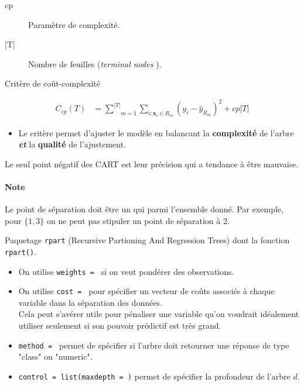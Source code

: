\documentclass[10pt, french]{article}
\begin{document}
\begin{multicols*}{3}
\begin{definitionNOHFILL}
\begin{description}
	\item[cp]	Paramètre de complexité.
	\item[|T|]	Nombre de feuilles (\og \textit{terminal nodes} \fg{}).
	\item[Critère de coût-complexité]
\end{description}
\begin{align*}
	C_{cp}(T)	
	&=	\underset{m = 1}{\overset{| T |}{\sum}}\underset{i:\bm{x}_{i} \in R_{m}}{\sum} (y_{i} - \hat{y}_{R_{m}})^{2} + cp | T |
\end{align*}
\begin{itemize}[leftmargin = *]
	\item	Le critère permet d'ajuster le modèle en balancant la \textbf{complexité} de l'arbre \textbf{\textit{et}} la \textbf{qualité} de l'ajustement.
\end{itemize}
\end{definitionNOHFILL}

Le seul point négatif des CART est leur précision qui a tendance à être mauvaise.

\paragraph{Note}	Le point de séparation doit être un qui parmi l'ensemble donné. Par exemple, pour $\{1, 3\}$  on ne peut pas stipuler un point de séparation à 2.

\begin{definitionNOHFILLsub}
Paquetage \texttt{rpart} (Recursive Partioning And Regression Trees) dont la fonction \texttt{rpart()}.
\begin{itemize}
	\item	On utilise \texttt{weights = } si on veut pondérer des observations.
	\item	On utilise \texttt{cost = } pour spécifier un vecteur de coûts associés à chaque variable dans la séparation des données. \\
			Cela peut s'avérer utile pour pénaliser une variable qu'on voudrait idéalement utiliser seulement si son pouvoir prédictif est très grand.
	\item	\texttt{method = } permet de spécifier si l'arbre doit retourner une réponse de type "class" ou "numeric".
	\item	\texttt{control = list(maxdepth = )} permet de spécifier la profondeur de l'arbre $d$.
\end{itemize}


\end{definitionNOHFILLsub}
\end{multicols*}
\end{document}
